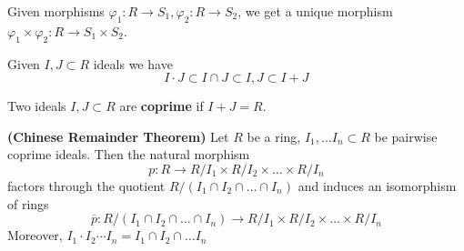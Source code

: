 \begin{rmk}
    Given morphisms $\varphi_1:R \rightarrow S_1, \varphi_2:R \rightarrow S_2$, we
    get a unique morphism $\varphi_{1} \times \varphi_2: R \rightarrow S_1 \times S_2$.
\end{rmk}
\begin{rmk}
    Given $I,J \subset R$ ideals we have
    $$
    I \cdot J \subset I \cap J \subset I, J \subset I + J
    $$
\end{rmk}
\begin{defn} \label{Defn 4, Jan 9}
    Two ideals $I,J \subset R$ are \textbf{coprime} if $I + J = R$.
\end{defn}
\begin{thm} \label{Thm 5, Jan 9}
    \textbf{(Chinese Remainder Theorem)} Let $R$ be a ring, $I_1, \dots I_n \subset R$
    be pairwise coprime ideals. Then the natural morphism
    $$
    p: R \rightarrow R / I_1 \times R / I_2 \times \dots \times R / I_n
    $$
    factors through the quotient $R / (I_1 \cap I_2 \cap \dots \cap I_n)$ and induces
    an isomorphism of rings
    $$
    \overline{p}: R / (I_1 \cap I_2 \cap \dots \cap I_n) \rightarrow R / I_1 \times R / I_2 \times \dots \times R / I_n
    $$
    Moreover, $I_1 \cdot I_2 \cdots I_n = I_1 \cap I_2 \cap \dots I_n$
\end{thm}
